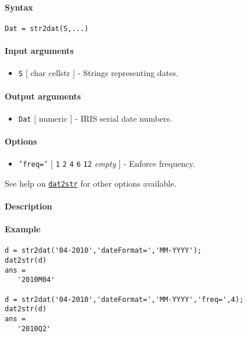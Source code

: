 


	\paragraph{Syntax}\label{syntax}

\begin{verbatim}
Dat = str2dat(S,...)
\end{verbatim}

\paragraph{Input arguments}\label{input-arguments}

\begin{itemize}
\itemsep1pt\parskip0pt
\item
  \texttt{S} {[} char \textbar{} cellstr {]} - Strings representing
  dates.
\end{itemize}

\paragraph{Output arguments}\label{output-arguments}

\begin{itemize}
\itemsep1pt\parskip0pt
\item
  \texttt{Dat} {[} numeric {]} - IRIS serial date numbers.
\end{itemize}

\paragraph{Options}\label{options}

\begin{itemize}
\itemsep1pt\parskip0pt
\item
  \texttt{'freq='} {[} \texttt{1} \textbar{} \texttt{2} \textbar{}
  \texttt{4} \textbar{} \texttt{6} \textbar{} \texttt{12} \textbar{}
  \emph{empty} {]} - Enforce frequency.
\end{itemize}

See help on \href{dates/dat2str}{\texttt{dat2str}} for other options
available.

\paragraph{Description}\label{description}

\paragraph{Example}\label{example}

\begin{verbatim}
d = str2dat('04-2010','dateFormat=','MM-YYYY');
dat2str(d)
ans =
   '2010M04'

d = str2dat('04-2010','dateFormat=','MM-YYYY','freq=',4);
dat2str(d)
ans =
   '2010Q2'
\end{verbatim}


